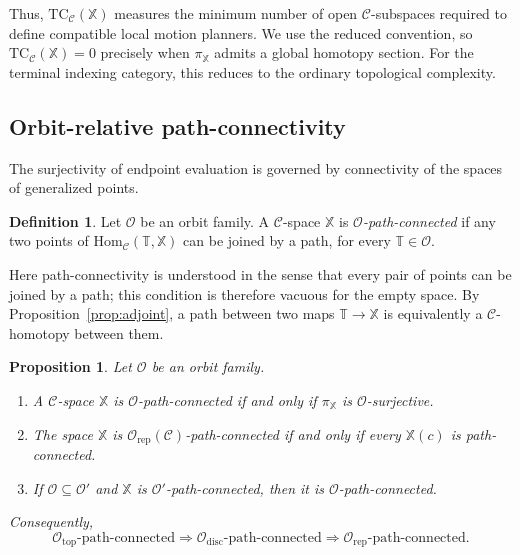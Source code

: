 \documentclass[12pt]{amsart}
\newtheorem{prop}[teo]{Proposition}
\theoremstyle{definition}
\newtheorem{defi}[teo]{Definition}
\theoremstyle{remark}
\numberwithin{figure}{section}%
\newcommand{\CC}{\mathcal{C}}
\newcommand{\TC}{\mathrm{TC}}
\newcommand{\X}{\mathbb{X}}
\newcommand{\T}{\mathbb{T}}
\newcommand{\Hom}{\mathrm{Hom}}
\begin{document}
Thus, $\TC_{\CC}(\X)$ measures the minimum number of open
$\CC$-subspaces required to define compatible local motion planners.
We use the reduced convention, so $\TC_{\CC}(\X)=0$ precisely when
$\pi_{\X}$ admits a global homotopy section. For the terminal indexing
category, this reduces to the ordinary topological complexity.

\subsection{Orbit-relative path-connectivity}

The surjectivity of endpoint evaluation is governed by connectivity of
the spaces of generalized points.

\begin{defi}\label{def:O-path-connected}
Let $\mathcal O$ be an orbit family. A $\CC$-space $\X$ is
\emph{$\mathcal O$-path-connected} if any two points of
$\Hom_{\CC}(\T,\X)$ can be joined by a path, for every
$\T\in\mathcal O$.
\end{defi}

Here path-connectivity is understood in the sense that every pair of
points can be joined by a path; this condition is therefore vacuous for
the empty space. By Proposition~\ref{prop:adjoint}, a path between two
maps $\T\to\X$ is equivalently a $\CC$-homotopy between them.

\begin{prop}
\label{prop:connectivity-monotone}
\label{prop:representable-connected}
\label{prop:pathfibration_surjective}
\label{cor:canonical-connectivity}
Let $\mathcal O$ be an orbit family.
\begin{enumerate}
    \item A $\CC$-space $\X$ is $\mathcal O$-path-connected if and only
    if $\pi_{\X}$ is $\mathcal O$-surjective.

    \item The space $\X$ is
    $\mathcal O_{\mathrm{rep}}(\CC)$-path-connected if and only if
    every $\X(c)$ is path-connected.

    \item If $\mathcal O\subseteq\mathcal O'$ and $\X$ is
    $\mathcal O'$-path-connected, then it is
    $\mathcal O$-path-connected.
\end{enumerate}
Consequently,
\[
\mathcal O_{\mathrm{top}}\text{-path-connected}
\Longrightarrow
\mathcal O_{\mathrm{disc}}\text{-path-connected}
\Longrightarrow
\mathcal O_{\mathrm{rep}}\text{-path-connected}.
\]
\end{prop}
\end{document}
